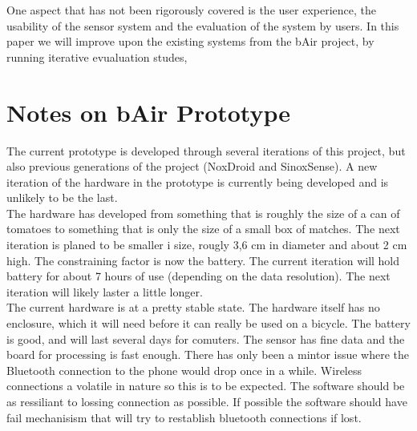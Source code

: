 \documentclass{ituthesis}
\begin{document}
One aspect that has not been rigorously covered is the user experience, the usability of the sensor system and the evaluation of the system by users. In this paper we will improve upon the existing systems from the bAir project, by running iterative evualuation studes,



\section{Notes on bAir Prototype}
The current prototype is developed through several iterations of this project, but also previous generations of the project (NoxDroid and SinoxSense). A new iteration of the hardware in the prototype is currently being developed and is unlikely to be the last.\\

The hardware has developed from something that is roughly the size of a can of tomatoes to something that is only the size of a small box of matches. The next iteration is planed to be smaller i size, rougly 3,6 cm in diameter and about 2 cm high. The constraining factor is now the battery. The current iteration will hold battery for about 7 hours of use (depending on the data resolution). The next iteration will likely laster a little longer.\\

The current hardware is at a pretty stable state. The hardware itself has no enclosure, which it will need before it can really be used on a bicycle. The battery is good, and will last several days for comuters. The sensor has fine data and the board for processing is fast enough. There has only been a mintor issue where the Bluetooth connection to the phone would drop once in a while. Wireless connections a volatile in nature so this is to be expected. The software should be as ressiliant to lossing connection as possible. If possible the software should have fail mechanisism that will try to restablish bluetooth connections if lost.\\
\end{document}
